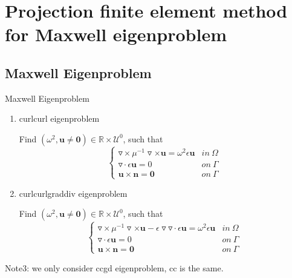 \documentclass[13pt]{beamer}
\begin{document}
\section{Projection finite element method for Maxwell eigenproblem}

\subsection{Maxwell Eigenproblem}
\begin{frame}[t]{Maxwell Eigenproblem}
  \begin{block}{}
     \begin{enumerate}
     \item curlcurl eigenproblem

       Find $(\omega^2, \mathbf{u}\neq\mathbf{0})\in\mathbb{R}\times\mathcal{U}^0$, such that
       \begin{equation}
         \nonumber
         \left\{\begin{array}{cc}
           \triangledown\times\mu^{-1}\triangledown\times\mathbf{u} = \omega^2\epsilon\mathbf{u} &  in\ \Omega \\
           \triangledown\cdot\epsilon\mathbf{u} = 0  & on\ \Gamma  \\
           \mathbf{u}\times\mathbf{n} = \mathbf{0}  & on\ \Gamma
         \end{array}\right.
       \end{equation}
     \item curlcurlgraddiv eigenproblem

       Find $(\omega^2, \mathbf{u}\neq\mathbf{0})\in\mathbb{R}\times\mathcal{U}^0$, such that
       \begin{equation}
         \nonumber
         \left\{\begin{array}{cc}
           \triangledown\times\mu^{-1}\triangledown\times\mathbf{u} - \epsilon\triangledown\triangledown\cdot\epsilon\mathbf{u}= \omega^2\epsilon\mathbf{u} &  in\ \Omega \\
           \triangledown\cdot\epsilon\mathbf{u} = 0  & on\ \Gamma  \\
           \mathbf{u}\times\mathbf{n} = \mathbf{0}  & on\ \Gamma
         \end{array}\right.
       \end{equation}
     \end{enumerate}
     Note3: we only consider ccgd eigenproblem, cc is the same.
  \end{block}

\end{frame}
\end{document}
